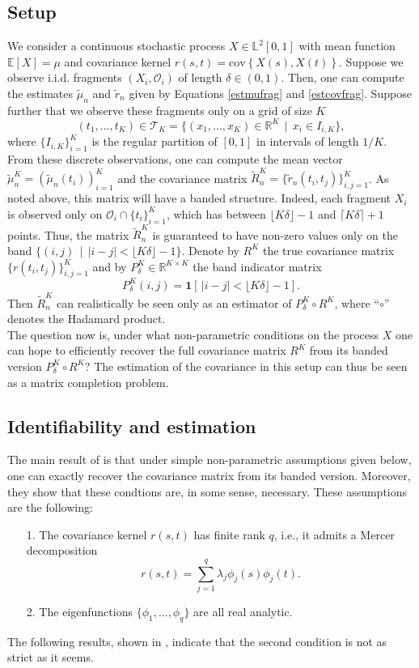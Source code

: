 \documentclass[10pt, a4paper]{report}
\newcommand{\E}[0]{\mathbb{E}}
\newcommand{\Ll}[0]{\mathbb{L}}
\newcommand{\R}[0]{\mathbb{R}}
\theoremstyle{definition}
\theoremstyle{remark}
\begin{document}
\subsection{Setup}\label{recovsetup}
We consider a continuous stochastic process $X \in \Ll^2[0,1]$ with mean function $\E[X]=\mu$ and covariance kernel $r(s,t) = \text{cov}\! \left\{ X(s) , X(t) \right\}$. Suppose we observe i.i.d. fragments $(X_i,\mathcal{O}_i)$ of length $\delta \in (0,1)$. Then, one can compute the estimates $\tilde{\mu}_n$ and $\tilde{r}_n$ given by Equations \ref{estmufrag} and \ref{estcovfrag}. Suppose further that we observe these fragments only on a grid of size $K$
\[ (t_1,...,t_K) \in \mathcal{T}_K = \{(x_1,...,x_K)\in \R^K \, \mid \, x_i \in I_{i,K} \}, \]
where $\{I_{i,K}\}_{i=1}^K$ is the regular partition of $[0,1]$ in intervals of length $1/K$. From these discrete observations, one can compute the mean vector $\tilde{\mu}_n^K = (\tilde{\mu}_n(t_i))_{i=1}^K$ and the covariance matrix $\tilde{R}_n^K = \{\tilde{r}_n(t_i,t_j)\}_{i,j=1}^K$. As noted above, this matrix will have a banded structure. Indeed, each fragment $X_i$ is observed only on $\mathcal{O}_i \cap \{t_i\}_{i=1}^K$, which has between $\lfloor{K\delta}\rfloor -1$ and $\lceil{K\delta}\rceil +1$ points. Thus, the matrix $\tilde{R}_n^K$ is guaranteed to have non-zero values only on the band $\{(i,j) \, \mid \, \vert i-j\vert < \lfloor{K\delta}\rfloor -1\}$. Denote by $R^K$ the true covariance matrix $\{r(t_i,t_j)\}_{i,j=1}^K$ and by $P_\delta^K \in \R^{K \times K}$ the band indicator matrix 
$$P_{\delta}^K(i,j) = \mathbf{1}\left[\, \vert i-j\vert < \lfloor{K\delta}\rfloor -1\right].$$
Then $\tilde{R}_n^K$ can realistically be seen only as an estimator of $P_{\delta}^K \circ R^K$, where ``$\circ$'' denotes the Hadamard product. \\
The question now is, under what non-parametric conditions on the process $X$ one can hope to efficiently recover the full covariance matrix $R^K$ from its banded version $P_{\delta}^K \circ R^K$? The estimation of the covariance in this setup can thus be seen as a matrix completion problem. 

\subsection{Identifiability and estimation}
The main result of \cite{DP2} is that under simple non-parametric assumptions given below, one can exactly recover the covariance matrix from its banded version. Moreover, they show that these condtions are, in some sense, necessary. These assumptions are the following:
\begin{itemize}
	\item[1.] The covariance kernel $r(s,t)$ has finite rank $q$, i.e., it admits a Mercer decomposition 
	$$r(s,t) = \sum_{j=1}^{q} \lambda_j \phi_j(s)\phi_j(t).$$
	\item[2.] The eigenfunctions $\{\phi_1,...,\phi_q\}$ are all real analytic.
\end{itemize}
The following results, shown in \cite[Prop.]{DP1}, indicate that the second condition is not as strict as it seems.
\end{document}
